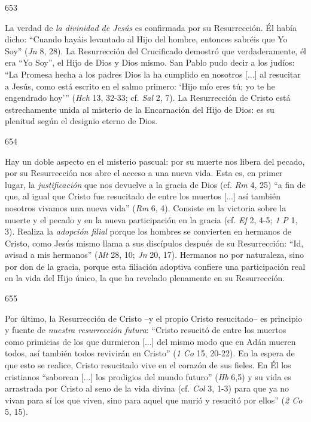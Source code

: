 			\begin{ccebody}\begin{ccenumber}653\end{ccenumber} La verdad de \textit{la divinidad de Jesús} es confirmada por su Resurrección. Él había dicho: “Cuando hayáis levantado al Hijo del hombre, entonces sabréis que Yo Soy” (\textit{Jn} 8, 28). La Resurrección del Crucificado demostró que verdaderamente, él era “Yo Soy”, el Hijo de Dios y Dios mismo. San Pablo pudo decir a los judíos: “La Promesa hecha a los padres Dios la ha cumplido en nosotros [...] al resucitar a Jesús, como está escrito en el salmo primero: ‘Hijo mío eres tú; yo te he engendrado hoy’” (\textit{Hch} 13, 32-33; cf. \textit{Sal} 2, 7). La Resurrección de Cristo está estrechamente unida al misterio de la Encarnación del Hijo de Dios: es su plenitud según el designio eterno de Dios.\end{ccebody}
			
			\begin{ccebody}\begin{ccenumber}654\end{ccenumber} Hay un doble aspecto en el misterio pascual: por su muerte nos libera del pecado, por su Resurrección nos abre el acceso a una nueva vida. Esta es, en primer lugar, la \textit{justificación} que nos devuelve a la gracia de Dios (cf. \textit{Rm} 4, 25) “a fin de que, al igual que Cristo fue resucitado de entre los muertos [...] así también nosotros vivamos una nueva vida” (\textit{Rm} 6, 4). Consiste en la victoria sobre la muerte y el pecado y en la nueva participación en la gracia (cf. \textit{Ef} 2, 4-5; \textit{1 P} 1, 3). Realiza la \textit{adopción filial} porque los hombres se convierten en hermanos de Cristo, como Jesús mismo llama a sus discípulos después de su Resurrección: “Id, avisad a mis hermanos” (\textit{Mt} 28, 10; \textit{Jn} 20, 17). Hermanos no por naturaleza, sino por don de la gracia, porque esta filiación adoptiva confiere una participación real en la vida del Hijo único, la que ha revelado plenamente en su Resurrección.\end{ccebody}
			
			\begin{ccebody}\begin{ccenumber}655\end{ccenumber} Por último, la Resurrección de Cristo –y el propio Cristo resucitado– es principio y fuente de \textit{nuestra resurrección futura}: “Cristo resucitó de entre los muertos como primicias de los que durmieron [...] del mismo modo que en Adán mueren todos, así también todos revivirán en Cristo” (\textit{1 Co} 15, 20-22). En la espera de que esto se realice, Cristo resucitado vive en el corazón de sus fieles. En Él los cristianos “saborean [...] los prodigios del mundo futuro” (\textit{Hb} 6,5) y su vida es arrastrada por Cristo al seno de la vida divina (cf. \textit{Col} 3, 1-3) para que ya no vivan para sí los que viven, sino para aquel que murió y resucitó por ellos” (\textit{2 Co} 5, 15).\end{ccebody}
			
